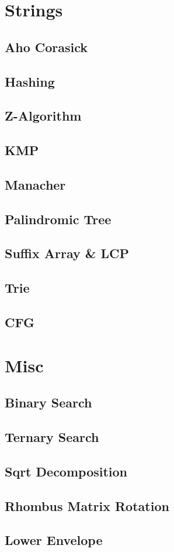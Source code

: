 	\section{Strings}
		\subsection{Aho Corasick}
			
		\subsection{Hashing}
			
		\subsection{Z-Algorithm}
			
		\subsection{KMP}
			
		\subsection{Manacher}
			
		\subsection{Palindromic Tree}
			
		\subsection{Suffix Array \& LCP}
			
		\subsection{Trie}
			
		\subsection{CFG}
			
	\section{Misc}
		\subsection{Binary Search}
			
		\subsection{Ternary Search}
			
		\subsection{Sqrt Decomposition}
			
		\subsection{Rhombus Matrix Rotation}
			
		\subsection{Lower Envelope}
			